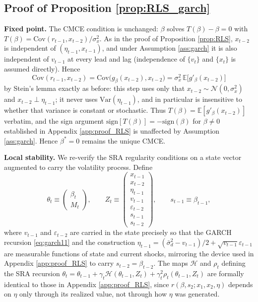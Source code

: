 \subsection{Proof of Proposition \ref{prop:RLS_garch}}\label{app:proof_RLS_garch}

\textbf{Fixed point.} The CMCE condition is unchanged: $\beta$ solves $T(\beta)-\beta=0$ with
$T(\beta)=\mathrm{Cov}(r_{t-1},x_{t-2})/\sigma_x^2$. As in the proof of Proposition \ref{prop:RLS},
$x_{t-2}$ is independent of $(\eta_{t-1},x_{t-1})$, and under Assumption \ref{ass:garch} it is also
independent of $v_{t-1}$ at every lead and lag (independence of $\{v_t\}$ and $\{x_t\}$ is assumed
directly). Hence
\[
\mathrm{Cov}(r_{t-1},x_{t-2}) = \mathrm{Cov}\bigl(g_\beta(x_{t-2}),x_{t-2}\bigr) = \sigma_x^2\,
\mathbb E\bigl[g'_\beta(x_{t-2})\bigr]
\]
by Stein's lemma exactly as before: this step uses only that $x_{t-2}\sim\mathcal N(0,\sigma_x^2)$ and
$x_{t-2}\perp \eta_{t-1}$; it never uses $\mathrm{Var}(\eta_{t-1})$, and in particular is insensitive
to whether that variance is constant or stochastic. Thus $T(\beta)=\mathbb E[g'_\beta(x_{t-2})]$
verbatim, and the sign argument $\mathrm{sign}[T(\beta)]=-\mathrm{sign}(\beta)$ for $\beta\neq 0$
established in Appendix \ref{app:proof_RLS} is unaffected by Assumption \ref{ass:garch}. Hence
$\beta^*=0$ remains the unique CMCE.

\textbf{Local stability.} We re-verify the SRA regularity conditions on a state vector augmented to
carry the volatility process. Define
\[
\theta_t \equiv \begin{pmatrix}\beta_t\\ M_t\end{pmatrix}, \qquad
Z_t \equiv \begin{pmatrix} x_{t-1}\\ x_{t-2}\\ \eta_{t-1}\\ v_{t-1}\\ \varepsilon_{t-2} \\ s_{t-1}\\ s_{t-2}\end{pmatrix},
\qquad s_{t-1}\equiv \beta_{t-1},
\]
where $v_{t-1}$ and $\varepsilon_{t-2}$ are carried in the state precisely so that the GARCH recursion
\eqref{eq:garch11} and the construction $\eta_{t-1}=(\bar\sigma_d^2-v_{t-1})/2+\sqrt{v_{t-1}}\varepsilon_{t-1}$
are measurable functions of state and current shocks, mirroring the device used in Appendix
\ref{app:proof_RLS} to carry $s_{t-2}=\beta_{t-2}$. The maps $\mathcal H$ and $\rho_t$ defining the SRA
recursion $\theta_t=\theta_{t-1}+\gamma_t\mathcal H(\theta_{t-1},Z_t)+\gamma_t^2\rho_t(\theta_{t-1},Z_t)$
are formally identical to those in Appendix \ref{app:proof_RLS}, since $r(\beta,s_2;x_1,x_2,\eta)$
depends on $\eta$ only through its realized value, not through how $\eta$ was generated.

